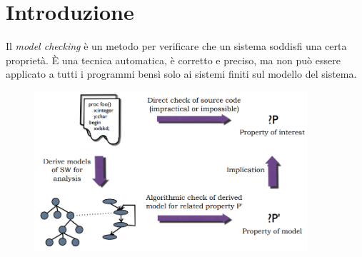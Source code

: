 \documentclass[a4paper,oneside,titlepage]{book}
\begin{document}
\section{Introduzione} %
Il \textit{model checking} è un metodo per verificare che un sistema soddisfi una certa proprietà. \`{E} una tecnica automatica, è corretto e preciso, ma non può essere applicato a tutti i programmi bensì solo ai sistemi finiti sul modello del sistema.
\begin{figure}[htp]
	\centering
	\includegraphics[width=0.9\textwidth]{mc1.png}
\end{figure}
\end{document}
